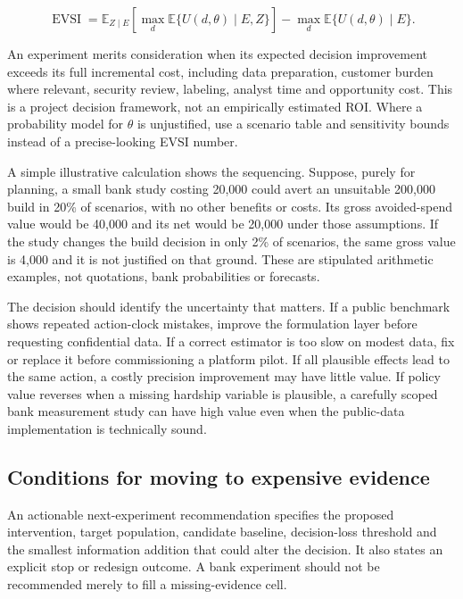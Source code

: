 \[
\operatorname{EVSI}
=\mathbb E_{Z\mid E}\!\left[\max_d\mathbb E\{U(d,\theta)\mid E,Z\}\right]
-\max_d\mathbb E\{U(d,\theta)\mid E\}.
\]

An experiment merits consideration when its expected decision
improvement exceeds its full incremental cost, including data
preparation, customer burden where relevant, security review, labeling,
analyst time and opportunity cost. This is a project decision framework,
not an empirically estimated ROI. Where a probability model for
\(\theta\) is unjustified, use a scenario table and sensitivity bounds
instead of a precise-looking EVSI number.

A simple illustrative calculation shows the sequencing. Suppose, purely
for planning, a small bank study costing 20,000 could avert an
unsuitable 200,000 build in 20\% of scenarios, with no other benefits or
costs. Its gross avoided-spend value would be 40,000 and its net would
be 20,000 under those assumptions. If the study changes the build
decision in only 2\% of scenarios, the same gross value is 4,000 and it
is not justified on that ground. These are stipulated arithmetic
examples, not quotations, bank probabilities or forecasts.

The decision should identify the uncertainty that matters. If a public
benchmark shows repeated action-clock mistakes, improve the formulation
layer before requesting confidential data. If a correct estimator is too
slow on modest data, fix or replace it before commissioning a platform
pilot. If all plausible effects lead to the same action, a costly
precision improvement may have little value. If policy value reverses
when a missing hardship variable is plausible, a carefully scoped bank
measurement study can have high value even when the public-data
implementation is technically sound.

\hypertarget{conditions-for-moving-to-expensive-evidence}{%
\subsection{Conditions for moving to expensive
evidence}\label{conditions-for-moving-to-expensive-evidence}}

An actionable next-experiment recommendation specifies the proposed
intervention, target population, candidate baseline, decision-loss
threshold and the smallest information addition that could alter the
decision. It also states an explicit stop or redesign outcome. A bank
experiment should not be recommended merely to fill a missing-evidence
cell.

